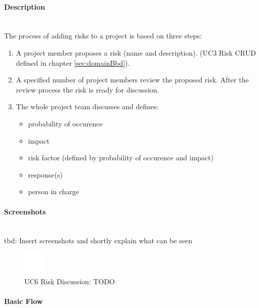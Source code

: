 \paragraph*{Description}\mbox{}\\
The process of adding risks to a project is based on three steps:
\begin{enumerate}
	\vspace{-3mm}
	\setlength\itemsep{-1em}
	
	\item A project member proposes a risk (name and description). (UC3 Risk CRUD defined in chapter \ref{sec:domainBbd}).
	\item A specified number of project members review the proposed risk. After the review process the risk is ready for discussion.
	\item The whole project team discusses and defines:
	\begin{itemize}
		\vspace{-3mm}
		\setlength\itemsep{-1em}
		
		\item probability of occurence
		\item impact
		\item risk factor (defined by probability of occurence and impact)
		\item response(s)
		\item person in charge
	\end{itemize}
\end{enumerate}

\paragraph*{Screenshots}\mbox{}\\
tbd: Insert screenshots and shortly explain what can be seen
\begin{figure}[h] 
	\centering
	\includegraphics[width=0.1\textwidth]{Content/Domain/placeholder.png}
	\caption{\ac{UC}6 Risk Discussion: TODO}
	\label{fig:label6}
\end{figure}

\newpage

\paragraph*{Basic Flow} \mbox{}\\

